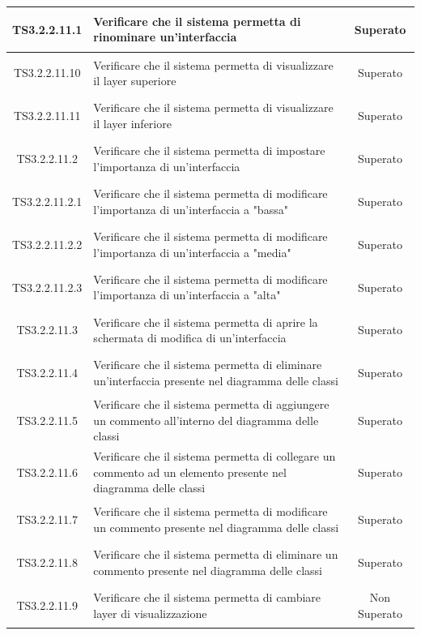 \documentclass[../PianoDiQualifica.tex]{subfiles}
\begin{document}
\begin{longtable}{|c|>{\centering}p{10cm}|c|}
	\hline
	\hypertarget{TS3.2.2.11.1}{TS3.2.2.11.1} & Verificare che il sistema permetta di rinominare un'interfaccia & Superato\\
	\hline
	\hypertarget{TS3.2.2.11.10}{TS3.2.2.11.10} & Verificare che il sistema permetta di visualizzare il layer superiore & Superato \\
	\hline
	\hypertarget{TS3.2.2.11.11}{TS3.2.2.11.11} & Verificare che il sistema permetta di visualizzare il layer inferiore & Superato \\
	\hline
	\hypertarget{TS3.2.2.11.2}{TS3.2.2.11.2} & Verificare che il sistema permetta di impostare l'importanza di un'interfaccia & Superato \\
	\hline
	\hypertarget{TS3.2.2.11.2.1}{TS3.2.2.11.2.1} & Verificare che il sistema permetta di modificare l'importanza di un'interfaccia a "bassa" & Superato \\
	\hline
	\hypertarget{TS3.2.2.11.2.2}{TS3.2.2.11.2.2} & Verificare che il sistema permetta di modificare l'importanza di un'interfaccia a "media" & Superato\\
	\hline
	\hypertarget{TS3.2.2.11.2.3}{TS3.2.2.11.2.3} & Verificare che il sistema permetta di modificare l'importanza di un'interfaccia a "alta" & Superato \\
	\hline
	\hypertarget{TS3.2.2.11.3}{TS3.2.2.11.3} & Verificare che il sistema permetta di aprire la schermata di modifica di un'interfaccia & Superato \\
	\hline
	\hypertarget{TS3.2.2.11.4}{TS3.2.2.11.4} & Verificare che il sistema permetta di eliminare un'interfaccia presente nel diagramma delle classi & Superato \\
	\hline
	\hypertarget{TS3.2.2.11.5}{TS3.2.2.11.5} & Verificare che il sistema permetta di aggiungere un commento all'interno del diagramma delle classi & Superato\\
	\hline
	\hypertarget{TS3.2.2.11.6}{TS3.2.2.11.6} & Verificare che il sistema permetta di collegare un commento ad un elemento presente nel diagramma delle classi & Superato \\
	\hline
	\hypertarget{TS3.2.2.11.7}{TS3.2.2.11.7} & Verificare che il sistema permetta di modificare un commento presente nel diagramma delle classi & Superato \\
	\hline
	\hypertarget{TS3.2.2.11.8}{TS3.2.2.11.8} & Verificare che il sistema permetta di eliminare un commento presente nel diagramma delle classi & Superato\\
	\hline
	\hypertarget{TS3.2.2.11.9}{TS3.2.2.11.9} & Verificare che il sistema permetta di cambiare layer di visualizzazione & Non Superato \\

\end{longtable}
\end{document}
